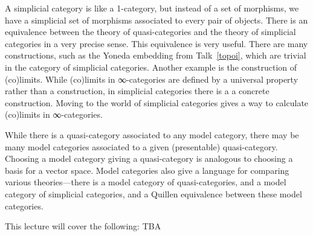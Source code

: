 \documentclass[a4paper]{amsart}
\numberwithin{figure}{section}
\theoremstyle{theorem}
\theoremstyle{definition}
\begin{document}
A simplicial category is like a 1-category, but instead of a set of morphisms, we have a simplicial set of morphisms associated to every pair of objects. There is an equivalence between the theory of quasi-categories and the theory of simplicial categories in a very precise sense. This equivalence is very useful. There are many constructions, such as the Yoneda embedding from Talk~\ref{topoi}, which are trivial in the category of simplicial categories. Another example is the construction of (co)limits. While (co)limits in ∞-categories are defined by a universal property rather than a construction, in simplicial categories there is a a concrete construction. Moving to the world of simplicial categories gives a way to calculate (co)limits in ∞-categories.

While there is a quasi-category associated to any model category, there may be many model categories associated to a given (presentable) quasi-category. Choosing a model category giving a quasi-category is analogous to choosing a basis for a vector space. Model categories also give a language for comparing various theories---there is a model category of quasi-categories, and a model category of simplicial categories, and a Quillen equivalence between these model categories. 

This lecture will cover the following: TBA
\end{document}
